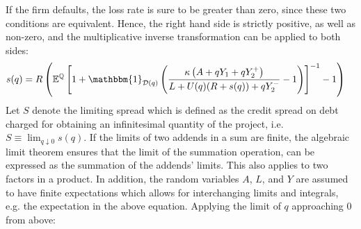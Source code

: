 \documentclass[../main.tex]{subfiles}
\begin{document}
        If the firm defaults, the loss rate is sure to be greater than zero,
        since these two conditions are equivalent. 
        Hence, the right hand side is strictly positive, as well as non-zero,
        and the multiplicative inverse transformation can be applied to both sides:
            \begin{align}
                    s(q)
                &=
                    \grossrfrate
                    \left(
                        \mathbb{E}^{\rnmeasure}\left[
                            1
                            +
                            \mathbbm{1}_{\mathcal{D}(q)}
                            \left(
                                \frac{
                                    \kappa 
                                    \left(
                                        A + q Y_{1} + q Y_{2}^{+}
                                    \right)
                                }{
                                    L 
                                    +
                                    U(q)
                                    (\grossrfrate + s(q))
                                    +
                                    q Y_{2}^{-} 
                                }
                                -
                                1
                            \right) 
                        \right]^{-1}
                        - 
                        1
                    \right)
                \nonumber
            \end{align}
        Let $S$ denote the limiting spread which is defined as the credit spread on debt 
        charged for obtaining an infinitesimal quantity of the project, i.e.
        $S \equiv \lim_{q\downarrow 0} s(q)$.
        If the limits of two addends in a sum are finite, 
        the algebraic limit theorem ensures that the limit of the summation operation,
        can be expressed as the summation of the addends' limits.
        This also applies to two factors in a product.
        In addition, the random variables $A$, $L$, and $Y$ are assumed to have finite expectations
        which allows for interchanging limits and integrals, e.g. the expectation in the above equation.
        Applying the limit of $q$ approaching $0$ from above:
\end{document}
